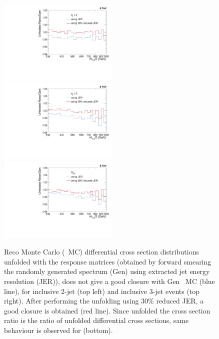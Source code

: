 \begin{figure}[!h]
 \begin{center}
 \hspace*{-3mm}\includegraphics[width=0.51\textwidth]{Plots_HT_2_150/Comparison_closure_2_range.pdf}%
 ~~\includegraphics[width=0.51\textwidth]{Plots_HT_2_150/Comparison_closure_3.pdf}\\
 \includegraphics[width=0.51\textwidth]{Plots_HT_2_150/Comparison_closure_ratio_32_now.pdf}
 \caption{Reco \MadGraphF \plus \PYTHIAS Monte Carlo (\MGP~MC) differential cross section distributions unfolded with the response matrices (obtained by forward smearing the randomly generated spectrum (Gen) using extracted jet energy resolution (JER)), does not give a good closure with Gen \MGP~MC (blue line), for inclusive 2-jet (top left) and inclusive 3-jet events (top right). After performing the unfolding using 30\% reduced JER, a good closure is obtained (red line). Since unfolded the cross section ratio \ratio is the ratio of unfolded differential cross sections, same behaviour is observed for \ratio (bottom).}
 \label{fig:unfolded_reco_NLO}
 \end{center}
\end{figure}

